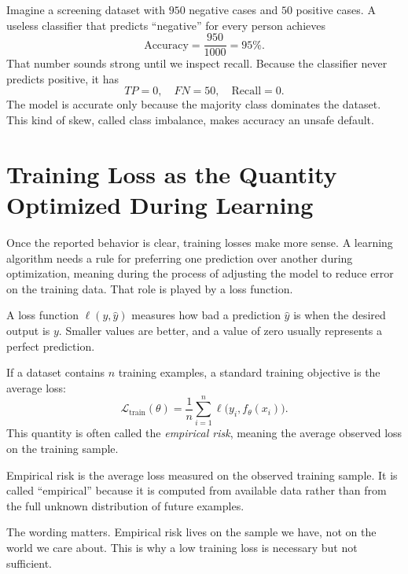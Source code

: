 \begin{example}
Imagine a screening dataset with $950$ negative cases and $50$ positive cases. A useless classifier that predicts ``negative'' for every person achieves
\[
\text{Accuracy} = \frac{950}{1000} = 95\%.
\]
That number sounds strong until we inspect recall. Because the classifier never predicts positive, it has
\[
TP=0,\quad FN=50,\quad \text{Recall}=0.
\]
The model is accurate only because the majority class dominates the dataset. This kind of skew, called class imbalance, makes accuracy an unsafe default.
\end{example}

\section{Training Loss as the Quantity Optimized During Learning}

Once the reported behavior is clear, training losses make more sense. A learning algorithm needs a rule for preferring one prediction over another during optimization, meaning during the process of adjusting the model to reduce error on the training data. That role is played by a loss function.

\begin{definition}
A loss function $\ell(y,\hat{y})$ measures how bad a prediction $\hat{y}$ is when the desired output is $y$. Smaller values are better, and a value of zero usually represents a perfect prediction.
\end{definition}

If a dataset contains $n$ training examples, a standard training objective is the average loss:
\[
\mathcal{L}_{\text{train}}(\theta) = \frac{1}{n} \sum_{i=1}^{n} \ell \bigl(y_i, f_\theta(x_i)\bigr).
\]
This quantity is often called the \emph{empirical risk}, meaning the average observed loss on the training sample.

\begin{definition}
Empirical risk is the average loss measured on the observed training sample. It is called ``empirical'' because it is computed from available data rather than from the full unknown distribution of future examples.
\end{definition}

The wording matters. Empirical risk lives on the sample we have, not on the world we care about. This is why a low training loss is necessary but not sufficient.

